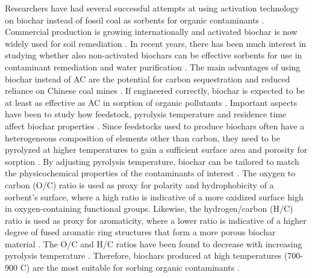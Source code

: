 Researchers have had several successful attempts at using activation technology on biochar instead of fossil coal as sorbents for organic contaminants \citep{Sormo2021}. Commercial production is growing internationally and activated biochar is now widely used for soil remediation \citep{hagemann2018activated}. In recent years, there has been much interest in studying whether also non-activated biochars can be effective sorbents for use in contaminant remediation and water purification \citep{hagemann2018activated}. The main advantages of using biochar instead of AC are the potential for carbon sequestration \citep{smith2016soil} and reduced reliance on Chinese coal mines \citep{zheng2019influence}. If engineered correctly, biochar is expected to be at least as effective as AC in sorption of organic pollutants \citep{Sormo2021}. Important aspects have been to study how feedstock, pyrolysis temperature and residence time affect biochar properties \citep{Hale2016}. Since feedstocks used to produce biochars often have a heterogeneous composition of elements other than carbon, they need to be pyrolyzed at higher temperatures to gain a sufficient surface area and porosity for sorption \citep{beesley2011review}. By adjusting pyrolysis temperature, biochar can be tailored to match the physicochemical properties of the contaminants of interest \citep{Hale2016}. The oxygen to carbon (O/C) ratio is used as proxy for polarity and hydrophobicity of a sorbent's surface, where a high ratio is indicative of a more oxidized surface high in oxygen-containing functional groups. Likewise, the hydrogen/carbon (H/C) ratio is used as proxy for aromaticity, where a lower ratio is indicative of a higher degree of fused aromatic ring structures that form a more porous biochar material \citep{Ahmad2014}. The O/C and H/C ratios have been found to decrease with increasing pyrolysis temperature \citep{Hale2016}. Therefore, biochars produced at high temperatures (700-900 \textdegree C) are the most suitable for sorbing organic contaminants \citep{Figueiredo2018}. 

